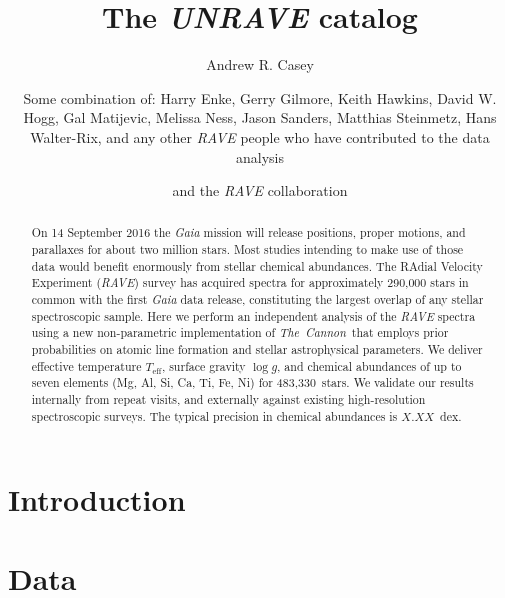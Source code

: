 \documentclass[preprint2,trackchanges]{aastex}
\newcommand{\project}[1]{\textsl{#1}}
\newcommand{\thecannon}{\project{The~Cannon}}
\newcommand{\logg}{\log g}
\newcommand{\teff}{T_{\mathrm{eff}}}
\newcommand{\Nstars}{483,330}
\begin{document}
\title{The \project{UNRAVE} catalog}

\author{Andrew R. Casey}

\author{Some combination of: Harry Enke, Gerry Gilmore, Keith Hawkins, David W. Hogg, Gal Matijevic, Melissa Ness, Jason Sanders, Matthias Steinmetz, Hans Walter-Rix, and any other \project{RAVE} people who have contributed to the data analysis}

\author{and the \project{RAVE} collaboration}

\begin{abstract}
On 14 September 2016 the \project{Gaia} mission will release positions, proper motions, and parallaxes for about two million stars.  Most studies intending to make use of those data would benefit enormously from stellar chemical abundances.  The RAdial Velocity Experiment (\project{RAVE}) survey has acquired spectra for approximately 290,000 stars in common with the first \project{Gaia} data release, constituting the largest overlap of any stellar spectroscopic sample.  Here we perform an independent analysis of the \project{RAVE} spectra using a new non-parametric implementation of \thecannon\ that employs prior probabilities on atomic line formation and stellar astrophysical parameters.  We deliver effective temperature $\teff$, surface gravity $\logg$, and chemical abundances of up to seven elements (Mg, Al, Si, Ca, Ti, Fe, Ni) for \Nstars\ stars.  We validate our results internally from repeat visits, and externally against existing high-resolution spectroscopic surveys.  The typical precision in chemical abundances is $X.XX$~dex.  
\end{abstract}

\keywords{}

\section{Introduction} 
\label{sec:introduction}




\section{Data}
\label{sec:data}
\end{document}

